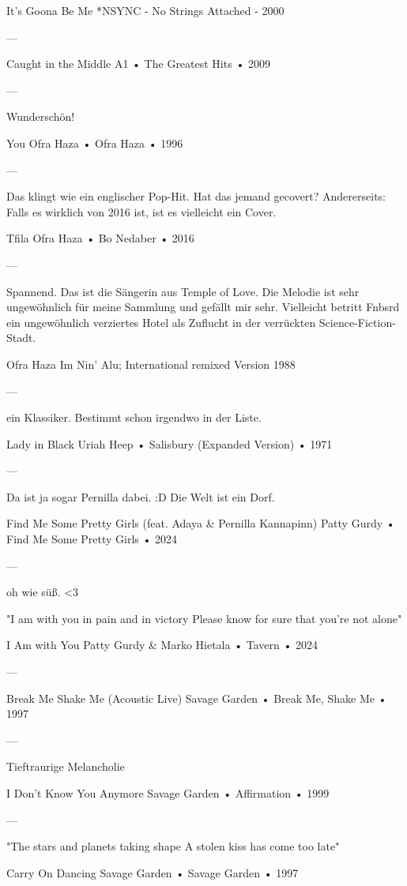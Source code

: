 It's Goona Be Me
*NSYNC - No Strings Attached - 2000

—

Caught in the Middle
A1
 •
The Greatest Hits
 •
2009

—

Wunderschön!

You
Ofra Haza
 •
Ofra Haza
 •
1996

—

Das klingt wie ein englischer Pop-Hit. Hat das jemand gecovert? Andererseits: Falls es wirklich von 2016 ist, ist es vielleicht ein Cover.

Tfila
Ofra Haza
 •
Bo Nedaber
 •
2016

—

Spannend. Das ist die Sängerin aus Temple of Love. Die Melodie ist sehr ungewöhnlich für meine Sammlung und gefällt mir sehr. Vielleicht betritt Fnbsrd ein ungewöhnlich verziertes Hotel als Zuflucht in der verrückten Science-Fiction-Stadt.

Ofra Haza Im Nin' Alu; International remixed Version
1988

—

ein Klassiker. Bestimmt schon irgendwo in der Liste.

Lady in Black
Uriah Heep
 •
Salisbury (Expanded Version)
 •
1971

—

Da ist ja sogar Pernilla dabei. :D Die Welt ist ein Dorf.

Find Me Some Pretty Girls (feat. Adaya & Pernilla Kannapinn)
Patty Gurdy
 •
Find Me Some Pretty Girls
 •
2024

—

oh wie süß. <3

"I am with you in pain and in victory
Please know for sure that you're not alone"

I Am with You
Patty Gurdy
 &
Marko Hietala
 •
Tavern
 •
2024

—

Break Me Shake Me (Acoustic Live)
Savage Garden
 •
Break Me, Shake Me
 • 1997

—

Tieftraurige Melancholie

I Don't Know You Anymore
Savage Garden
 •
Affirmation
 • 1999

—

"The stars and planets taking shape
A stolen kiss has come too late"

Carry On Dancing
Savage Garden
 •
Savage Garden
 • 1997


